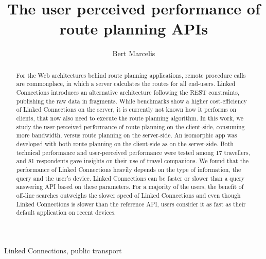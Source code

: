 \documentclass[twocolumn]{phdsymp} %
\begin{document}
\title{The user perceived performance of route planning APIs} %

\author{Bert Marcelis}


\maketitle

\begin{abstract}
For the Web architectures behind route planning applications, remote procedure calls are commonplace, in which a server calculates the routes for all end-users. Linked Connections introduces an alternative architecture following the REST constraints, publishing the raw data in fragments. While benchmarks show a higher cost-efficiency of Linked Connections on the server, it is currently not known how it performs on clients, that now also need to execute the route planning algorithm. In this work, we study the user-perceived performance of route planning on the client-side, consuming more bandwidth, versus route planning on the server-side. An isomorphic app was developed with both route planning on the client-side as on the server-side. Both technical performance and user-perceived performance were tested among 17 travellers, and 81 respondents gave insights on their use of travel companions.
We found that the performance of Linked Connections heavily depends on the type of information, the query and the user’s device. Linked Connections can be faster or slower than a query answering API based on these parameters. For a majority of the users, the benefit of off-line searches outweighs the slower speed of Linked Connections and even though Linked Connections is slower than the reference API, users consider it as fast as their default application on recent devices.


\end{abstract}

\begin{keywords}
Linked Connections, public transport
\end{keywords}
\end{document}
